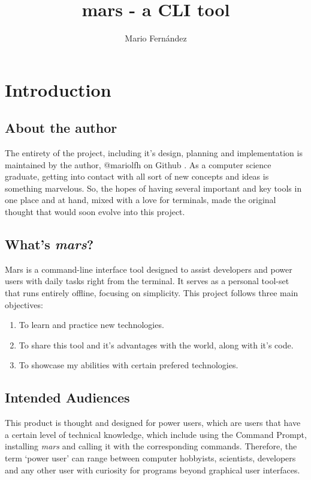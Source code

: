 \documentclass{report}
\title{mars - a CLI tool}
\author{Mario Fernández}
\begin{document}
\maketitle
 
\tableofcontents

\chapter{Introduction}
\section{About the author}
The entirety of the project, including it's design, planning and implementation is maintained by the author, @mariolfh on Github \cite{githubinc.MariolfhOverview2025}. As a computer science graduate, getting into contact with all sort of new concepts and ideas is something marvelous. So, the hopes of having several important and key tools in one place and at hand, mixed with a love for terminals, made the original thought that would soon evolve into this project. 

\section{What's \emph{mars}?}
Mars is a command-line interface tool designed to assist developers and power users with daily tasks right from the terminal. It serves as a personal tool-set that runs entirely offline, focusing on simplicity.
This project follows three main objectives:
\begin{enumerate}
\item{To learn and practice new technologies.}
\item{To share this tool and it's advantages with the world, along with it's code.}
\item{To showcase my abilities with certain prefered technologies.}
\end{enumerate}

\section{Intended Audiences}
This product is thought and designed for power users, which are users that have a certain level of technical knowledge, which include using the Command Prompt, installing \emph{mars} and calling it with the corresponding commands. Therefore, the term `power user' can range between computer hobbyists, scientists, developers and any other user with curiosity for programs beyond graphical user interfaces.
\end{document}
